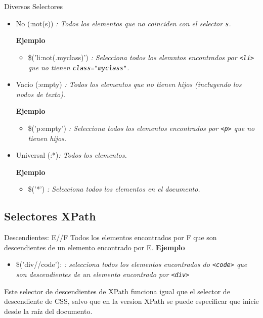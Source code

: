 \begin{frame}[fragile]{Diversos Selectores} %
\begin{itemize}
    \item No (:not(s)) \textit{: Todos los elementos que no coinciden con el
    selector \texttt{s}.}
    
    \textbf{Ejemplo}
    \begin{itemize}
        \item \$('li:not(.myclass)') \textit{: Selecciona todos los elemntos
        encontrados por \texttt{<li>} que no tienen \texttt{class="myclass"}.}
    \end{itemize}
    \item Vacio (:empty) \textit{: Todos los elementos que no tienen hijos
    (incluyendo los nodos de texto).}
    
    \textbf{Ejemplo}
    \begin{itemize}
        \item \$('p:empty') \textit{: Selecciona todos los elementos
        encontrados por \texttt{<p>} que no tienen hijos.}
    \end{itemize}
    \item Universal (:*)\textit{: Todos los elementos.}
    
    \textbf{Ejemplo}
    \begin{itemize}
        \item \$('*') \textit{: Selecciona todos los elementos en el documento.}
    \end{itemize}
\end{itemize}
\end{frame}

\subsection{Selectores XPath} %

\begin{frame}[fragile]{Descendientes: E//F} %
Todos los elementos encontrados por F que son descendientes de un elemento
encontrado por E.
\textbf{Ejemplo}
\begin{itemize}
    \item \$('div//code'): \textit{: selecciona todos los elementos encontrados
    do \texttt{<code>} que son descendientes de un elemento encontrado por
    \texttt{<div>}}
\end{itemize}
Este selector de descendientes de XPath funciona igual que el selector de
descendiente de CSS, salvo que en la version XPath se puede especificar que
inicie desde la raíz del documento.
\end{frame}

